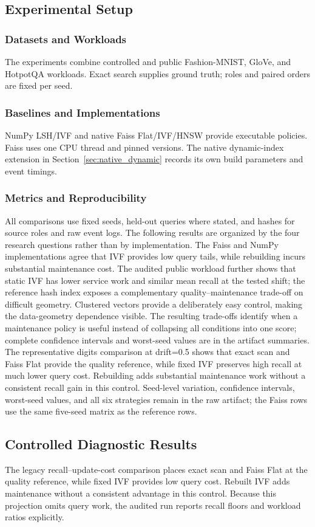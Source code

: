 \subsection{Experimental Setup}
\subsubsection{Datasets and Workloads}
The experiments combine controlled and public Fashion-MNIST, GloVe, and HotpotQA
workloads. Exact search supplies ground truth; roles and paired orders are fixed per seed.
\subsubsection{Baselines and Implementations}
NumPy LSH/IVF and native Faiss Flat/IVF/HNSW provide executable policies. Faiss uses
one CPU thread and pinned versions. The native dynamic-index extension in
Section~\ref{sec:native_dynamic} records its own build parameters and event timings.
\subsubsection{Metrics and Reproducibility}
All comparisons use fixed seeds, held-out queries where stated, and hashes for source
roles and raw event logs. The following results are organized by the four research
questions rather than by implementation.
The Faiss and NumPy implementations agree that IVF provides low query tails, while
rebuilding incurs substantial maintenance cost. The audited public workload further
shows that static IVF has lower service work and similar mean recall at the tested shift;
the reference hash index exposes a complementary quality--maintenance trade-off on
difficult geometry. Clustered vectors provide a deliberately easy control, making the
data-geometry dependence visible. The resulting trade-offs identify when a maintenance
policy is useful instead of collapsing all conditions into one score; complete
confidence intervals and worst-seed values are in the artifact summaries.
The representative digits comparison at drift=0.5 shows that exact scan and Faiss
Flat provide the quality reference, while fixed IVF preserves high recall at much lower
query cost. Rebuilding adds substantial maintenance work without a consistent recall
gain in this control. Seed-level variation, confidence intervals, worst-seed values,
and all six strategies remain in the raw artifact; the Faiss rows use the same five-seed
matrix as the reference rows.
\subsection{Controlled Diagnostic Results}
The legacy recall--update-cost comparison places exact scan and Faiss Flat at the
quality reference, while fixed IVF provides low query cost. Rebuilt IVF adds maintenance
without a consistent advantage in this control. Because this projection omits query work,
the audited run reports recall floors and workload ratios explicitly.
